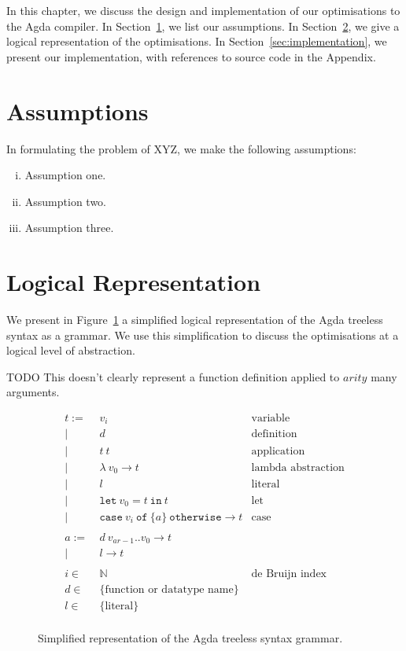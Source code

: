 In this chapter, we discuss the design and implementation of our optimisations to the Agda compiler. In Section~\ref{sec:assumptions}, we list our assumptions. In Section~\ref{sec:logical_representation}, we give a logical representation of the optimisations. In Section~\ref{sec:implementation}, we present our implementation, with references to source code in the Appendix.

\section{Assumptions}
\label{sec:assumptions}

In formulating the problem of XYZ, we make the following assumptions: 
\begin{enumerate}[(i)]
	\item Assumption one. 
	\item Assumption two. 
	\item Assumption three. 
\end{enumerate}


\section{Logical Representation}
\label{sec:logical_representation}

We present in Figure~\ref{fig:treeless_grammar} a simplified logical representation of the Agda treeless syntax as a grammar. We use this simplification to discuss the optimisations at a logical level of abstraction.

TODO This doesn't clearly represent a function definition applied to $arity$ many arguments.

\begin{figure}
\begin{align*}
t :=~& v_i & \text{variable}\\
|~& d & \text{definition}\\
|~& t~t & \text{application}\\
|~& \lambda~v_0 \to t & \text{lambda abstraction}\\
|~& l & \text{literal}\\
|~& \mathtt{let}~v_0 = t~\mathtt{in}~t & \text{let}\\
|~& \mathtt{case}~v_i~\mathtt{of}~\{a\}~\mathtt{otherwise} \to t& \text{case}\\
\\
a :=~& d~v_{ar-1}..v_0 \to t\\
|~& l \to t\\
\\
i \in~& \mathbb{N} & \text{de Bruijn index}\\
d \in~& \{\text{function or datatype name}\}\\
l \in~& \{\text{literal}\}\\
\end{align*}
\caption{Simplified representation of the Agda treeless syntax grammar.}
\label{fig:treeless_grammar}
\end{figure}

